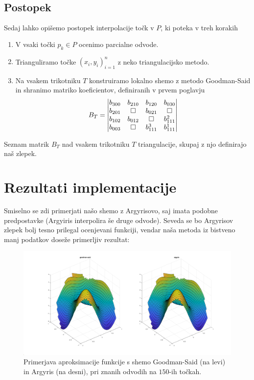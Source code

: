 \documentclass[ letterpaper, titlepage, fleqn]{article}
\newcommand{\openbox}{\leavevmode
  \hbox to.77778em{%
  \hfil\vrule
  \vbox to.675em{\hrule width.6em\vfil\hrule}%
  \vrule\hfil}}
\begin{document}
{\subsection{Postopek}
Sedaj lahko opišemo postopek interpolacije točk v $P$, ki poteka v treh korakih
\begin{enumerate}
\item V vsaki točki $p_k \in P$ ocenimo parcialne odvode.
\item Trianguliramo točke $(x_i,y_i)_{i=1}^n$ z neko triangulacijsko metodo.
\item Na vsakem trikotniku $T$ konstruiramo lokalno shemo z metodo Goodman-Said in shranimo matriko 
koeficientov, definiranih v prvem poglavju
\begin{equation*}
B_T = 
\begin{vmatrix}
b_{300} & b_{210} & b_{120} & b_{030} \\
b_{201} & \openbox & b_{021} & \openbox  \\
b_{102} & b_{012} & \openbox & b_{111}^2 \\
b_{003} & \openbox & b_{111}^3 & b_{111}^1
\end{vmatrix}
\end{equation*}
\end{enumerate}
Seznam  matrik $B_T$ nad vsakem trikotniku $T$ triangulacije, skupaj z njo
definirajo naš zlepek.

\section{Rezultati implementacije}

Smiselno se zdi primerjati našo shemo z Argyrisovo, saj imata podobne predpostavke (Argyiris interpolira še druge odvode). Seveda se bo Argyrisov zlepek bolj tesno prilegal ocenjevani funkciji, vendar naša metoda iz bistveno manj podatkov doseže primerljiv rezultat:
\begin{figure}[h]
\includegraphics[width=\textwidth]{slike/GSvA.png}
\caption{ 
Primerjava aproksimacije funkcije s shemo Goodman-Said (na levi) in Argyris (na desni),
pri znanih odvodih na $150$-ih točkah.}
\end{figure}

}
\end{document}
